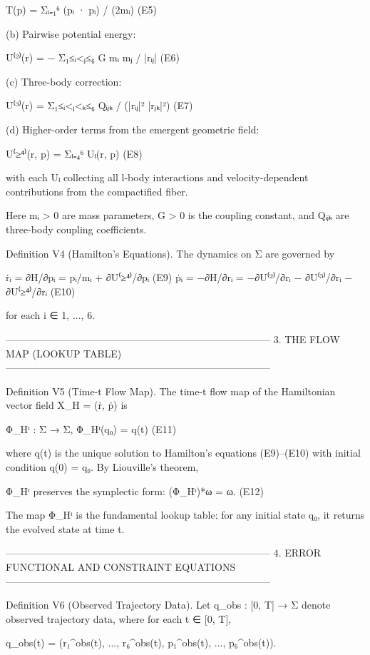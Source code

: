     T(p) = Σᵢ₌₁⁶  (pᵢ · pᵢ) / (2mᵢ)               (E5)

(b) Pairwise potential energy:

    U⁽²⁾(r) = − Σ₁≤ᵢ<ⱼ≤₆  G mᵢ mⱼ / |rᵢⱼ|        (E6)

(c) Three-body correction:

    U⁽³⁾(r) = Σ₁≤ᵢ<ⱼ<ₖ≤₆  Qᵢⱼₖ / (|rᵢⱼ|² |rⱼₖ|²)  (E7)

(d) Higher-order terms from the emergent geometric field:

    U⁽≥⁴⁾(r, p) = Σₗ₌₄⁶  Uₗ(r, p)                  (E8)

with each Uₗ collecting all l-body interactions and velocity-dependent
contributions from the compactified fiber.

Here mᵢ > 0 are mass parameters, G > 0 is the coupling constant, and Qᵢⱼₖ
are three-body coupling coefficients.


Definition V4 (Hamilton's Equations).
The dynamics on Σ are governed by

    ṙᵢ =  ∂H/∂pᵢ  = pᵢ/mᵢ + ∂U⁽≥⁴⁾/∂pᵢ          (E9)
    ṗᵢ = −∂H/∂rᵢ  = −∂U⁽²⁾/∂rᵢ − ∂U⁽³⁾/∂rᵢ − ∂U⁽≥⁴⁾/∂rᵢ   (E10)

for each i ∈ {1, ..., 6}.


--------------------------------------------------------------------------------
3. THE FLOW MAP (LOOKUP TABLE)
--------------------------------------------------------------------------------

Definition V5 (Time-t Flow Map).
The time-t flow map of the Hamiltonian vector field X_H = (ṙ, ṗ) is

    Φ_Hᵗ : Σ → Σ,     Φ_Hᵗ(q₀) = q(t)             (E11)

where q(t) is the unique solution to Hamilton's equations (E9)–(E10) with
initial condition q(0) = q₀. By Liouville's theorem,

    Φ_Hᵗ preserves the symplectic form:  (Φ_Hᵗ)*ω = ω.   (E12)

The map Φ_Hᵗ is the fundamental lookup table: for any initial state q₀,
it returns the evolved state at time t.


--------------------------------------------------------------------------------
4. ERROR FUNCTIONAL AND CONSTRAINT EQUATIONS
--------------------------------------------------------------------------------

Definition V6 (Observed Trajectory Data).
Let q_obs : [0, T] → Σ denote observed trajectory data, where for each
t ∈ [0, T],

    q_obs(t) = (r₁^{obs}(t), ..., r₆^{obs}(t), p₁^{obs}(t), ..., p₆^{obs}(t)).


